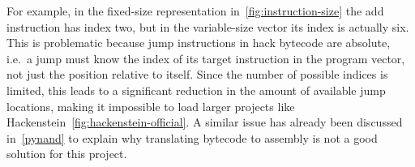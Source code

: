 For example, in the fixed-size representation in~\cref{fig:instruction-size} the add instruction has index two, but in the variable-size vector its index is actually six.
This is problematic because jump instructions in hack bytecode are absolute, i.e.\ a jump must know the index of its target instruction in the program vector, not just the position relative to itself.
Since the number of possible indices is limited, this leads to a significant reduction in the amount of available jump locations, making it impossible to load larger projects like Hackenstein~\ref{fig:hackenstein-official}.
A similar issue has already been discussed in~\cref{pynand} to explain why translating bytecode to assembly is not a good solution for this project.

